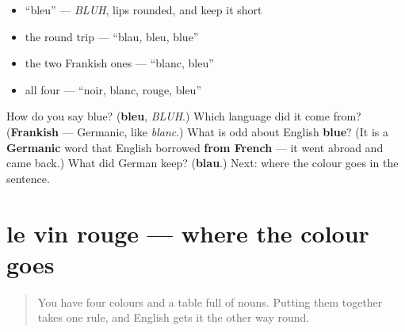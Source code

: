 \begin{itemize}
\raggedright
  \item \textquotedblleft{}bleu\textquotedblright{} — \emph{BLUH}, lips rounded, and keep it short
  \item the round trip — \textquotedblleft{}blau, bleu, blue\textquotedblright{}
  \item the two Frankish ones — \textquotedblleft{}blanc, bleu\textquotedblright{}
  \item all four — \textquotedblleft{}noir, blanc, rouge, bleu\textquotedblright{}
\end{itemize}

\begin{tcolorbox}[breakable,colback=teal!4,colframe=teal!35!black,title={Before you move on}]
How do you say blue? (\textbf{bleu}, \emph{BLUH}.) Which language did it come from? (\textbf{Frankish} — Germanic, like \emph{blanc}.) What is odd about English \textbf{blue}? (It is a \textbf{Germanic} word that English borrowed \textbf{from French} — it went abroad and came back.) What did German keep? (\textbf{blau}.) Next: where the colour goes in the sentence.
\end{tcolorbox}
\section[le vin rouge]{le vin rouge — where the colour goes}

\label{lesson:FR-C13-vin-rouge}



\begin{quote}
You have four colours and a table full of nouns. Putting them together takes one rule, and English gets it the other way round.
\end{quote}

